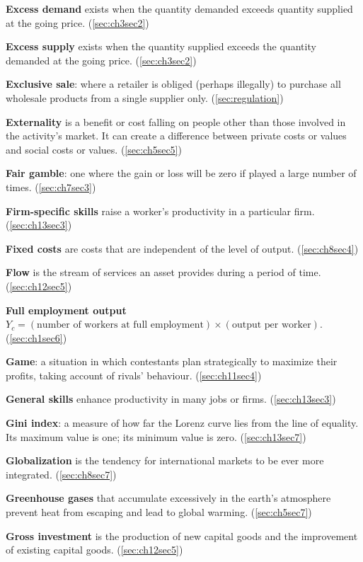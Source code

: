 \textbf{Excess demand} exists when the quantity demanded exceeds quantity supplied at the going price. (\ref{sec:ch3sec2})

\textbf{Excess supply} exists when the quantity supplied exceeds the quantity demanded at the going price. (\ref{sec:ch3sec2})

\textbf{Exclusive sale}: where a retailer is obliged (perhaps illegally) to purchase all wholesale products from a single supplier only. (\ref{sec:regulation})

\textbf{Externality} is a benefit or cost falling on people other than those involved in the activity's market. It can create a difference between private costs or values and social costs or values. (\ref{sec:ch5sec5})

\textbf{Fair gamble}: one where the gain or loss will be zero if played a large number of times. (\ref{sec:ch7sec3})

\textbf{Firm-specific skills} raise a worker's productivity in a particular firm. (\ref{sec:ch13sec3})

\textbf{Fixed costs} are costs that are independent of the level of output. (\ref{sec:ch8sec4})

\textbf{Flow} is the stream of services an asset provides during a period of time. (\ref{sec:ch12sec5})

\textbf{Full employment output} $Y_c = (\text{number of workers at full employment})\times(\text{output per worker})$. (\ref{sec:ch1sec6})

\textbf{Game}: a situation in which contestants plan strategically to maximize their profits, taking account of rivals' behaviour. (\ref{sec:ch11sec4})

\textbf{General skills} enhance productivity in many jobs or firms. (\ref{sec:ch13sec3})

\textbf{Gini index}: a measure of how far the Lorenz curve lies from the line of equality. Its maximum value is one; its minimum value is zero. (\ref{sec:ch13sec7})

\textbf{Globalization} is the tendency for international markets to be ever more integrated. (\ref{sec:ch8sec7})

\textbf{Greenhouse gases} that accumulate excessively in the earth's atmosphere prevent heat from escaping and lead to global warming. (\ref{sec:ch5sec7})

\textbf{Gross investment} is the production of new capital goods and the improvement of existing capital goods. (\ref{sec:ch12sec5})

